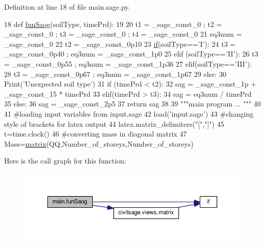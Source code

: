 Definition at line 18 of file main.\+sage.\+py.


\begin{DoxyCode}
18 \textcolor{keyword}{def }\hyperlink{namespacemain_a4f60afd2426ee9409955e4352b3f0486}{funSaog}(soilType, timePrd):
19 
20   t1 = \_sage\_const\_0 ; t2 = \_sage\_const\_0 ; t3 = \_sage\_const\_0 ; t4 = \_sage\_const\_0 
21   eq3num = \_sage\_const\_0 
22   t2 = \_sage\_const\_0p10 
23   \hyperlink{bootstrap_8min_8js_ac2d69f5011896c6ed4a54e0dd36f6334}{if}(soilType==\textcolor{stringliteral}{'I'}):
24       t3 = \_sage\_const\_0p40 ; eq3num = \_sage\_const\_1p0 
25   \textcolor{keywordflow}{elif} (soilType==\textcolor{stringliteral}{'II'}):
26       t3 = \_sage\_const\_0p55 ; eq3num = \_sage\_const\_1p36 
27   elif(soilType==\textcolor{stringliteral}{'III'}):
28       t3 = \_sage\_const\_0p67 ; eq3num = \_sage\_const\_1p67 
29   \textcolor{keywordflow}{else}:
30       Print(\textcolor{stringliteral}{'Unexpected soil type'})
31   \textcolor{keywordflow}{if} (timePrd < t2):
32       sag = \_sage\_const\_1p  + \_sage\_const\_15  * timePrd
33   elif(timePrd > t3):
34       sag = eq3num / timePrd
35   \textcolor{keywordflow}{else}:
36       sag = \_sage\_const\_2p5 
37   \textcolor{keywordflow}{return} sag
38 
39 \textcolor{stringliteral}{"""main program ... """}
40 
41 \textcolor{comment}{#loading input variables from input.sage}
42 load(\textcolor{stringliteral}{'input.sage'})
43 \textcolor{comment}{#changing style of brackets for latex output}
44 latex.matrix\_delimiters(\textcolor{stringliteral}{"["},\textcolor{stringliteral}{"]"})
45 t=time.clock()
46 \textcolor{comment}{#converting mass in diagonal matrix}
47 Mass=\hyperlink{namespacecivilsage_1_1views_a8b58c93a9c82e84143c43dafaa744a4b}{matrix}(QQ,Number\_of\_storeys,Number\_of\_storeys)
\end{DoxyCode}


Here is the call graph for this function\+:
\nopagebreak
\begin{figure}[H]
\begin{center}
\leavevmode
\includegraphics[width=350pt]{namespacemain_a4f60afd2426ee9409955e4352b3f0486_cgraph}
\end{center}
\end{figure}




